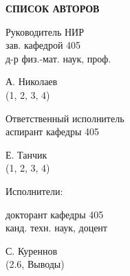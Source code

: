 
\begin{center}
{\normalsize\textbf{\centering СПИСОК АВТОРОВ}}\vspace{14pt} 
\end{center}


\begin{minipage}[t]{0.7\linewidth}
Руководитель НИР \\
зав. кафедрой 405 \\
д-р физ.-мат. наук, проф. 
\end{minipage}
\begin{minipage}[t]{0.3\linewidth}
А. Николаев \\
(1, 2, 3, 4)
\end{minipage}

\vskip1cm

\begin{minipage}[t]{0.7\linewidth}
Ответственный исполнитель \\
аспирант кафедры 405
\end{minipage}
\begin{minipage}[t]{0.3\linewidth}
Е. Танчик \\
(1, 2, 3, 4)
\end{minipage}

\vskip2cm

Исполнители: 

\vskip14pt


\begin{minipage}[t]{0.7\linewidth}
докторант кафедры 405 \\
канд. техн. наук, доцент
\end{minipage}
\begin{minipage}[t]{0.3\linewidth}
С. Куреннов \\
(2.6, Выводы)
\end{minipage}

